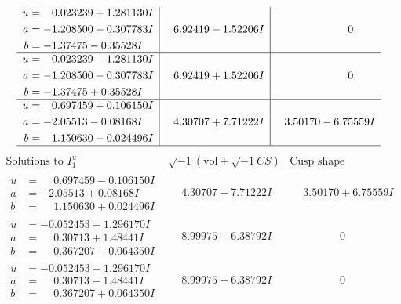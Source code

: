 \documentclass[1p]{elsarticle_modified}
\theoremstyle{definition}
\newcommand{\I}{\sqrt{-1}}
\begin{document}
$$\begin{array}{c|c|c}
\begin{aligned}
u &= \phantom{-}0.023239 + 1.281130 I \\
a &= -1.208500 + 0.307783 I \\
b &= -1.37475 - 0.35528 I\end{aligned}
 & \phantom{-}6.92419 - 1.52206 I & \phantom{-0.000000 } 0 \\ \hline\begin{aligned}
u &= \phantom{-}0.023239 - 1.281130 I \\
a &= -1.208500 - 0.307783 I \\
b &= -1.37475 + 0.35528 I\end{aligned}
 & \phantom{-}6.92419 + 1.52206 I & \phantom{-0.000000 } 0 \\ \hline\begin{aligned}
u &= \phantom{-}0.697459 + 0.106150 I \\
a &= -2.05513 - 0.08168 I \\
b &= \phantom{-}1.150630 - 0.024496 I\end{aligned}
 & \phantom{-}4.30707 + 7.71222 I & \phantom{-}3.50170 - 6.75559 I\\
 \hline 
 \end{array}$$\newpage$$\begin{array}{c|c|c}  
\text{Solutions to }I^u_{1}& \I (\text{vol} + \sqrt{-1}CS) & \text{Cusp shape}\\
 \hline 
\begin{aligned}
u &= \phantom{-}0.697459 - 0.106150 I \\
a &= -2.05513 + 0.08168 I \\
b &= \phantom{-}1.150630 + 0.024496 I\end{aligned}
 & \phantom{-}4.30707 - 7.71222 I & \phantom{-}3.50170 + 6.75559 I \\ \hline\begin{aligned}
u &= -0.052453 + 1.296170 I \\
a &= \phantom{-}0.30713 + 1.48441 I \\
b &= \phantom{-}0.367207 - 0.064350 I\end{aligned}
 & \phantom{-}8.99975 + 6.38792 I & \phantom{-0.000000 } 0 \\ \hline\begin{aligned}
u &= -0.052453 - 1.296170 I \\
a &= \phantom{-}0.30713 - 1.48441 I \\
b &= \phantom{-}0.367207 + 0.064350 I\end{aligned}
 & \phantom{-}8.99975 - 6.38792 I & \phantom{-0.000000 } 0 \\ \hline\begin{aligned}

\end{aligned}
\end{array}$$
\end{document}
